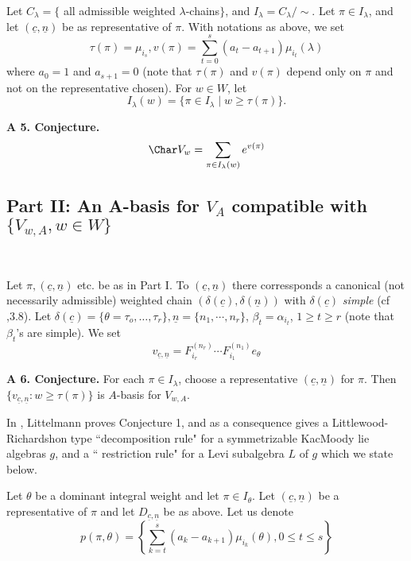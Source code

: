 Let $C_{\lambda}=\{$ all admissible weighted $\lambda$-chains$\}$, and $I_{\lambda} = C_{\lambda}/ \sim$. Let $ \pi \in I_{\lambda}$, and let $(\underline{c}, \underline{n})$ be as representative of $\pi$. With notations as above, we set
$$
\tau(\pi)= \mu_{i_{s}}, v(\pi) = \sum\limits_{t=0}^{s}(a_{t}-a_{t+1})\mu_{i_{t}}(\lambda)
$$
where $a_{0}=1$ and $ a_{s+1}=0$ (note that $\tau(\pi)$ and $ v(\pi)$ depend only on $\pi$ and not on the representative chosen). For $w \in W$, let
$$
I_{\lambda}(w) =\{\pi \in I_{\lambda} \;| \;w \geq \tau(\pi)\}.
$$

\medskip
\noindent
{\bfseries A 5. Conjecture.}\label{A. 5. Conjecture.}
$$
\Char V_{w}= \sum_{\pi \in I_{\lambda}(w)} e^{v(\pi)}
$$

\medskip
\subsection*{Part II: An A-basis for $V_{A}$ compatible with $\{V_{w,A}, w \in W\}$}
~

Let $\pi,(\underline{c}, \underline{n})$ etc. be as in Part I. To $(\underline{c}, \underline{n})$ there corressponds a canonical (not necessarily admissible) weighted chain $(\delta(\underline{c}), \delta(\underline{n}))$ with $\delta(\underline{c})$ \textit{simple} (cf \cite{art10-keyLa},3.8). Let $\delta(\underline{c}) = \{\theta = \tau_{o}, \ldots, \tau_{r}\}, \underline{n}= \{n_{1}, \cdots, n_{r}\}$, $\beta_{t} = \alpha_{i_{t}}$, $1 \geq t \geq r$ (note that $\beta_{t}$'s are simple). We set
$$
v_{\underline{c}, \underline{n}} = F_{i_{r}}^{(n_{r})}\cdots F_{i_{1}}^{(n_{1})}e_{\theta}
$$ 

\medskip
\noindent
{\bfseries A 6. Conjecture.}\label{A. 6. Conjecture.} For each $\pi \in I_{\lambda}$, choose a representative $(\underline{c}, \underline{n})$ for $\pi$. Then $\{v_{\underline{c}, \underline{n}}: w \geq \tau (\pi)\}$ is $A$-basis for $V_{w, A}$.

In \cite{art10-keyLi}, Littelmann proves Conjecture 1, and as a consequence gives a Littlewood-Richardshon type ``decomposition rule" for a symmetrizable KacMoody lie algebras $g$, and a `` restriction rule" for a Levi subalgebra $L$ of $g$ which we state below.

Let $\theta$ be a dominant integral weight and let $\pi \in I_{\theta}$. Let $(\underline{c}, \underline{n})$ be a representative of $\pi$ and let $D_{\underline{c}, \underline{n}}$ be as above. Let us denote
$$
p(\pi, \theta) = \left\{\sum\limits_{k=t}^{s}(a_{k}-a_{k+1})\mu_{i_{k}}(\theta), 0 \leq t \leq s \right\}
$$

